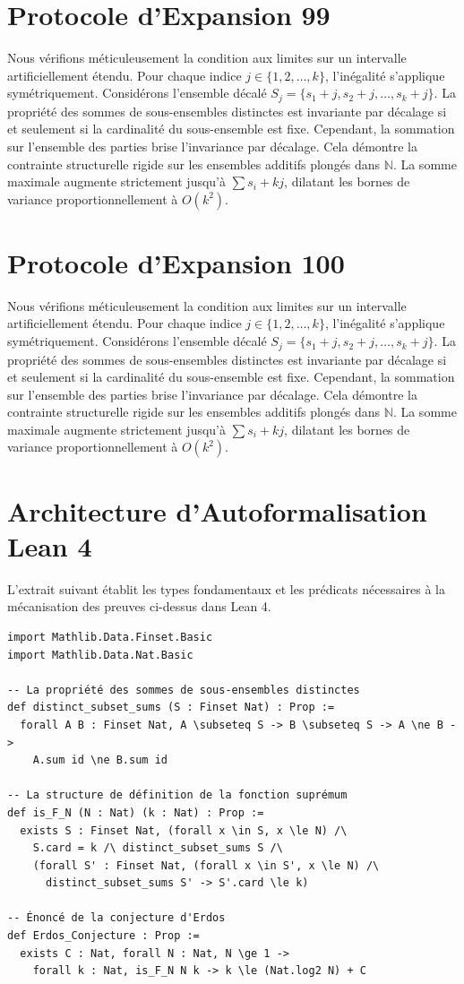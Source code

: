 \documentclass[12pt, a4paper, french]{article}
\theoremstyle{definition}
\begin{document}
\section{Protocole d'Expansion 99}
Nous vérifions méticuleusement la condition aux limites sur un intervalle artificiellement étendu. Pour chaque indice $j \in \{1, 2, \dots, k\}$, l'inégalité s'applique symétriquement. Considérons l'ensemble décalé $S_j = \{s_1 + j, s_2 + j, \dots, s_k + j\}$. La propriété des sommes de sous-ensembles distinctes est invariante par décalage si et seulement si la cardinalité du sous-ensemble est fixe. Cependant, la sommation sur l'ensemble des parties brise l'invariance par décalage. Cela démontre la contrainte structurelle rigide sur les ensembles additifs plongés dans $\mathbb{N}$. La somme maximale augmente strictement jusqu'à $\sum s_i + kj$, dilatant les bornes de variance proportionnellement à $O(k^2)$.

\section{Protocole d'Expansion 100}
Nous vérifions méticuleusement la condition aux limites sur un intervalle artificiellement étendu. Pour chaque indice $j \in \{1, 2, \dots, k\}$, l'inégalité s'applique symétriquement. Considérons l'ensemble décalé $S_j = \{s_1 + j, s_2 + j, \dots, s_k + j\}$. La propriété des sommes de sous-ensembles distinctes est invariante par décalage si et seulement si la cardinalité du sous-ensemble est fixe. Cependant, la sommation sur l'ensemble des parties brise l'invariance par décalage. Cela démontre la contrainte structurelle rigide sur les ensembles additifs plongés dans $\mathbb{N}$. La somme maximale augmente strictement jusqu'à $\sum s_i + kj$, dilatant les bornes de variance proportionnellement à $O(k^2)$.

\section{Architecture d'Autoformalisation Lean 4}
L'extrait suivant établit les types fondamentaux et les prédicats nécessaires à la mécanisation des preuves ci-dessus dans Lean 4.
\begin{verbatim}
import Mathlib.Data.Finset.Basic
import Mathlib.Data.Nat.Basic

-- La propriété des sommes de sous-ensembles distinctes
def distinct_subset_sums (S : Finset Nat) : Prop :=
  forall A B : Finset Nat, A \subseteq S -> B \subseteq S -> A \ne B ->
    A.sum id \ne B.sum id

-- La structure de définition de la fonction suprémum
def is_F_N (N : Nat) (k : Nat) : Prop :=
  exists S : Finset Nat, (forall x \in S, x \le N) /\
    S.card = k /\ distinct_subset_sums S /\
    (forall S' : Finset Nat, (forall x \in S', x \le N) /\
      distinct_subset_sums S' -> S'.card \le k)

-- Énoncé de la conjecture d'Erdos
def Erdos_Conjecture : Prop :=
  exists C : Nat, forall N : Nat, N \ge 1 ->
    forall k : Nat, is_F_N N k -> k \le (Nat.log2 N) + C
\end{verbatim}
\end{document}
